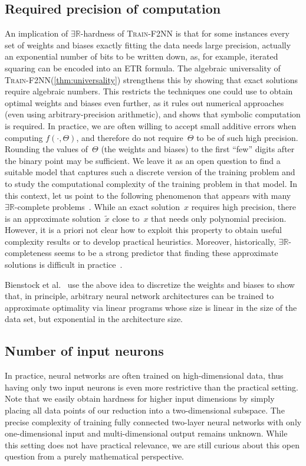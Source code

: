 \documentclass[11pt]{article}
\numberwithin{equation}{section}
\theoremstyle{definition}
\theoremstyle{plain}
\newcommand{\R}{\mathbb R}
\newcommand{\ER}{\texorpdfstring{\ensuremath{\exists\R}}{ER}\xspace}
\newcommand{\problemname}[1]{\textnormal{\textsc{#1}}\xspace}
\newcommand{\ETR}{\problemname{ETR}}
\newcommand{\trainNN}{\problemname{Train-F2NN}}
\newcommand{\fullyconnected}{fully connected\xspace}
\newcommand{\twolayer}{two-layer\xspace}
\theoremstyle{plain}
\begin{document}
\subsection{Required precision of computation}
An implication of \ER-hardness of \trainNN is that for some instances every set of 
weights and biases 
exactly fitting the data %
%
needs large precision, actually %
%
an exponential
%
number of bits to be written down,
%
as, for example, iterated squaring can be encoded into an \ETR formula.
%
%
%
%
The algebraic universality of \trainNN (\cref{thm:universality}) strengthens this
by showing that exact solutions require algebraic numbers.
This restricts the techniques one could use to obtain optimal weights and biases even further,
as it rules out numerical approaches (even using arbitrary-precision arithmetic), and shows
that symbolic computation is required.
In practice, we are often willing to accept small additive errors when computing $f(\cdot, \Theta)$,
and therefore do not require~$\Theta$ %
to be %
of such high precision.
Rounding %
the values of~$\Theta$ (the weights and biases) %
to the first \enquote{few} digits after the %
%
binary point  %
may be sufficient.
%
%
%
%
%
%
%
%
%
%
%
%
%
%
We leave it as an open question to find a suitable model that captures such a discrete version of the training problem and to study the computational complexity of the training problem in that model. In this context, let us point to the following phenomenon that appears with many \ER-complete problems~\cite{Erickson2022_SmoothingTheGap}.
%
%
While an exact solution~$x$ requires high precision, there is an approximate solution~$\tilde{x}$
close to~$x$ that needs only polynomial precision.
However, %
%
it is a priori not clear how to exploit this property to obtain useful complexity results or to develop practical heuristics.
%
%
%
%
%
%
%
%
%
%
Moreover, historically, \ER-completeness seems to be a strong predictor that finding these approximate solutions is difficult in practice~\cite{Deligkas2022_ApproximatingETR, Erickson2022_SmoothingTheGap}.

Bienstock et al.~\cite{Bienstock2023_LinearProgramming} use the above idea to discretize the weights and biases to show that, in principle, arbitrary neural network architectures can be trained to approximate optimality via linear programs whose
%
size is %
linear in the size of the data set, but exponential in the architecture size.
%
%
%
%
%
%
%
%
%

\subsection{Number of input neurons}
In practice, neural networks are often trained on 
%
high-dimensional  %
data, thus having only two input neurons is even more restrictive than the practical setting.
Note that we easily obtain hardness for higher input dimensions by simply placing all data points of our reduction into a two-dimensional subspace.
The precise complexity of training \fullyconnected \twolayer neural networks with only one-dimensional input and multi-dimensional output remains unknown.
While this setting does not have practical relevance, we are still curious about this open question from a purely mathematical perspective.
\end{document}
